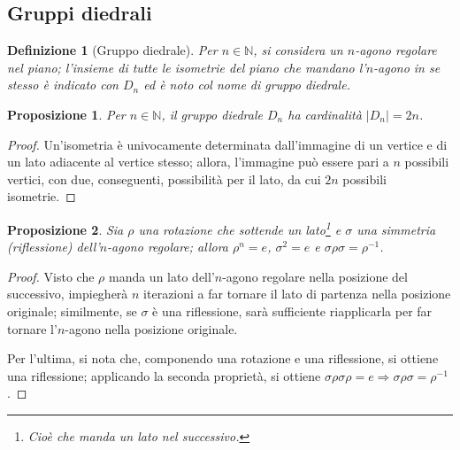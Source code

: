\documentclass[12pt]{scrartcl}
\theoremstyle{style}
\newtheorem{definizione}{Definizione}[section]
\newtheorem{prop}{Proposizione}[section]
\numberwithin{equation}{subsection}
\begin{document}
\subsection{Gruppi diedrali}
\begin{definizione}
	[Gruppo diedrale]
	Per $n \in \mathbb{N}$, si considera un $n$-agono regolare nel piano; l'insieme di tutte le isometrie del piano che mandano l'$n$-agono in se stesso \`e indicato con $D_n$ ed \`e noto col nome di \textit{gruppo diedrale}.
\end{definizione}
\begin{prop}
	Per $n \in \mathbb{N}$, il gruppo diedrale $D_n$ ha cardinalit\`a $\lvert D_n \rvert = 2n$.
\end{prop}
	\begin{proof}
		Un'isometria \`e univocamente determinata dall'immagine di un vertice e di un lato adiacente al vertice stesso; allora, l'immagine pu\`o essere pari a $n$ possibili vertici, con due, conseguenti, possibilit\`a per il lato, da cui $2n$ possibili isometrie.
	\end{proof}
\begin{prop}
	Sia $\rho $ una rotazione che sottende un lato\footnote{Cioè che manda un lato nel successivo.} e $\sigma $ una simmetria (riflessione) dell'$n$-agono regolare; allora $\rho ^n = e$, $\sigma ^2 =e$ e $\sigma \rho \sigma = \rho ^{-1} $.
\end{prop}
	\begin{proof}
		Visto che $\rho $ manda un lato dell'$n$-agono regolare nella posizione del successivo, impiegher\`a $n$ iterazioni a far tornare il lato di partenza nella posizione originale; similmente, se $\sigma $ \`e una riflessione, sar\`a sufficiente riapplicarla per far tornare l'$n$-agono nella posizione originale.

		Per l'ultima, si nota che, componendo una rotazione e una riflessione, si ottiene una riflessione; applicando la seconda propriet\`a, si ottiene $\sigma \rho \sigma \rho = e \Rightarrow \sigma \rho \sigma  = \rho ^{-1} $.
	\end{proof}
\end{document}
